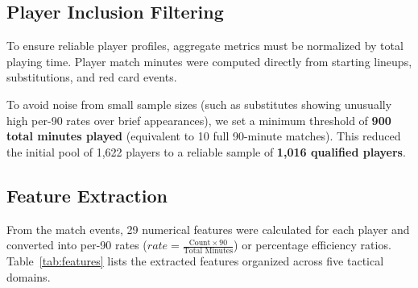 \documentclass[12pt]{ai_conquer2026}
\begin{document}
\subsection{Player Inclusion Filtering}
To ensure reliable player profiles, aggregate metrics must be normalized by total playing time. Player match minutes were computed directly from starting lineups, substitutions, and red card events.

To avoid noise from small sample sizes (such as substitutes showing unusually high per-90 rates over brief appearances), we set a minimum threshold of \textbf{900 total minutes played} (equivalent to 10 full 90-minute matches). This reduced the initial pool of 1,622 players to a reliable sample of \textbf{1,016 qualified players}.

\subsection{Feature Extraction}
From the match events, 29 numerical features were calculated for each player and converted into per-90 rates ($rate = \frac{\text{Count} \times 90}{\text{Total Minutes}}$) or percentage efficiency ratios. Table~\ref{tab:features} lists the extracted features organized across five tactical domains.
\end{document}
